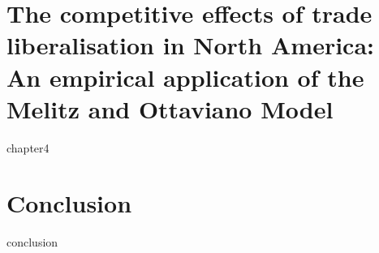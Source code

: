 \documentclass[oneside,12pt,a4paper]{CUEDthesisPSnPDF}
\begin{document}
\chapter{The competitive effects of trade liberalisation in North America: An empirical application of the Melitz and Ottaviano Model}  
{chapter4} 

\chapter{Conclusion} %
{conclusion}

\begin{spacing}{1.5}


\end{spacing}
\end{document}
